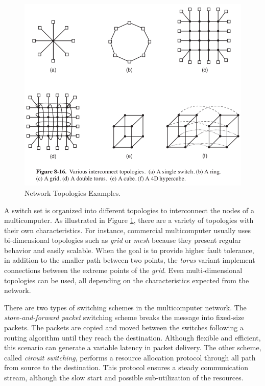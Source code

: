 				\begin{figure}[h]
					\centering
					\includegraphics[width=.8\textwidth]{images/net-topologies.png}

					\caption{
						Network Topologies Examples.
					}\par
					\label{fig.net-topologies}
				\end{figure}
				
				A switch set is organized into different topologies to interconnect
				the nodes of a multicomputer.
				As illustrated in Figure \ref{fig.net-topologies}, there are a
				variety of topologies with their own characteristics.
				For instance, commercial multicomputer usually uses bi-dimensional
				topologies such as \textit{grid} or \textit{mesh} because they present
				regular behavior and easily scalable.
				When the goal is to provide higher fault tolerance, in addition to the
				smaller path between two points, the \textit{torus} variant implement
				connections between the extreme points of the \textit{grid}.
				Even multi-dimensional topologies can be used, all depending on the
				characteristics expected from the network.

				There are two types of switching schemes in the multicomputer network.
				The \textit{store-and-forward packet} switching scheme breaks the message
				into fixed-size packets.
				The packets are copied and moved between the switches following a
				routing algorithm until they reach the destination.
				Although flexible and efficient, this scenario can generate a variable
				latency in packet delivery.
				The other scheme, called \textit{circuit switching}, performs a resource
				allocation protocol through all path from source to the destination.
				This protocol ensures a steady communication stream, although the
				slow start and possible sub-utilization of the resources.

